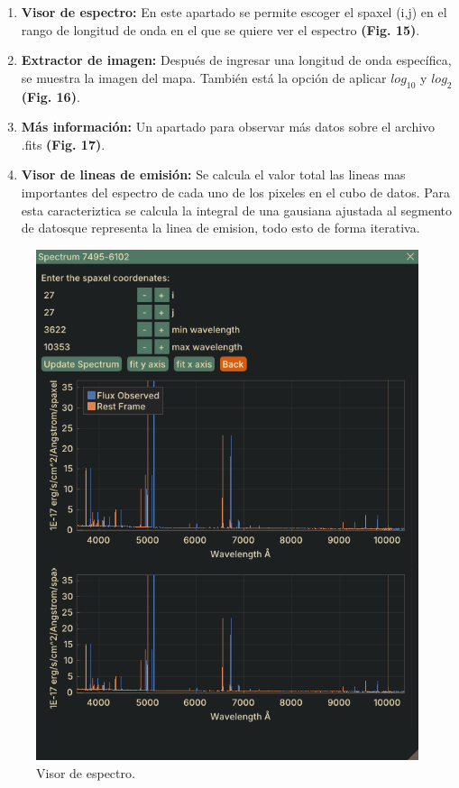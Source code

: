 \documentclass[9pt,twocolumn,a4paper]{opticajnl}
\begin{document}
\begin{enumerate}
    \item \textbf{Visor de espectro:} En este apartado se permite escoger el spaxel (i,j) en el rango de longitud de onda en el que se quiere ver el espectro \textbf{(Fig. 15)}.
    \item \textbf{Extractor de imagen:} Después de ingresar una longitud de onda específica, se muestra la imagen del mapa. También está la opción de aplicar $log_{10}$ y $log_{2}$ \textbf{(Fig. 16)}.
    \item \textbf{Más información:} Un apartado para observar más datos sobre el archivo .fits \textbf{(Fig. 17)}.
    \item \textbf{Visor de lineas de emisión: } Se calcula el valor total las lineas mas importantes del espectro de cada uno de los pixeles en el cubo de datos. Para esta caracteriztica se calcula la integral de una gausiana ajustada al segmento de datosque representa la linea de emision, todo esto de forma iterativa. 
\end{enumerate}

\begin{figure}
    \centering
    \includegraphics[width=1\linewidth]{spectrum_visor.png}
    \caption{Visor de espectro.}
    \label{fig:spectrum_visor}
\end{figure}
\end{document}
